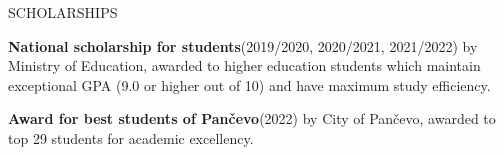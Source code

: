 \begin{minipage}[t]{\linewidth}\vspace{\sectionTopmargin}
{\alignRight\titleFont\light SCHOLARSHIPS}\linebreak\newline

\vspace{\rContentTopMargin}
{\contentFont\textbf{National scholarship for students}\linebreak (2019/2020, 2020/2021, 2021/2022)  by Ministry of Education, awarded to higher education students which maintain exceptional GPA (9.0 or higher out of 10) and have maximum study efficiency.}\alignRight\linebreak
\end{minipage}\newline

\begin{minipage}[t]{\linewidth}\vspace{\rContentTopMargin}
{\contentFont\textbf{Award for best students of Pančevo}\linebreak (2022) by City of Pančevo, awarded to top 29 students for academic excellency.}\alignRight\linebreak
\end{minipage}\newline